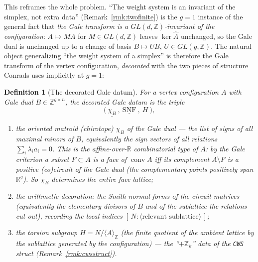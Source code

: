 \documentclass{amsart}
\newtheorem{definition}[theorem]{Definition}
\begin{document}
This reframes the whole problem. ``The weight system is an invariant of the
simplex, not extra data'' (Remark~\ref{rmk:twofinite}) is the $g=1$ instance of
the general fact that \emph{the Gale transform is a $GL(d,\mathbb Z)$-invariant
of the configuration}: $A\mapsto MA$ for $M\in GL(d,\mathbb Z)$ leaves
$\ker\widehat A$ unchanged, so the Gale dual is unchanged up to a change of basis
$B\mapsto UB$, $U\in GL(g,\mathbb Z)$. The natural object generalizing ``the
weight system of a simplex'' is therefore the Gale transform of the vertex
configuration, \emph{decorated} with the two pieces of structure Conrads uses
implicitly at $g=1$:

\begin{definition}[The decorated Gale datum]\label{def:galedatum}
For a vertex configuration $A$ with Gale dual $B\in\mathbb Z^{g\times n}$, the
\emph{decorated Gale datum} is the triple
\begin{equation}\label{eq:galedatum}
  \bigl(\ \underline{\chi_B}\ ,\ \underline{\mathrm{SNF}}\ ,\ H\ \bigr),
\end{equation}
\begin{enumerate}
  \item[\textnormal{(a)}] the \emph{oriented matroid} (chirotope) $\chi_B$ of the
        Gale dual --- the list of signs of all maximal minors of $B$, equivalently
        the sign vectors of all relations $\sum_i\lambda_i a_i=0$. This is the
        affine-over-$\mathbb R$ combinatorial type of $A$: by the Gale criterion a
        subset $F\subset A$ is a \emph{face} of $\operatorname{conv}A$ iff its
        complement $A\setminus F$ is a \emph{positive (co)circuit} of the Gale
        dual (the complementary points positively span $\mathbb R^g$). So
        $\chi_B$ determines the entire face lattice;
  \item[\textnormal{(b)}] the \emph{arithmetic decoration}: the Smith normal
        forms of the circuit matrices (equivalently the elementary divisors of
        $B$ and of the sublattice the relations cut out), recording the local
        indices $[\,N : \langle\text{relevant sublattice}\rangle\,]$;
  \item[\textnormal{(c)}] the \emph{torsion subgroup}
        $H=N/\langle A\rangle_{\mathbb Z}$ (the finite quotient of the ambient
        lattice by the sublattice generated by the configuration) --- the
        ``$+\mathbb Z_k$'' data of the \texttt{CWS} struct
        (Remark~\ref{rmk:cwsstruct}).
\end{enumerate}
\end{definition}
\end{document}
